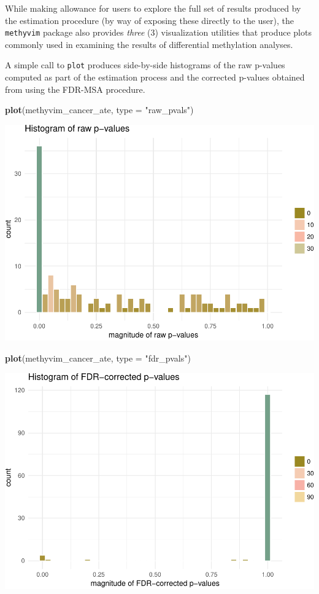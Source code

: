 \documentclass[9pt,a4paper,]{extarticle}
\newenvironment{Shaded}{\begin{snugshade}}{\end{snugshade}}
\newcommand{\KeywordTok}[1]{\textcolor[rgb]{0.13,0.29,0.53}{\textbf{#1}}}
\newcommand{\DataTypeTok}[1]{\textcolor[rgb]{0.13,0.29,0.53}{#1}}
\newcommand{\StringTok}[1]{\textcolor[rgb]{0.31,0.60,0.02}{#1}}
\newcommand{\NormalTok}[1]{#1}
\theoremstyle{definition}
\theoremstyle{definition}
\theoremstyle{definition}
\theoremstyle{remark}
\begin{document}
While making allowance for users to explore the full set of results
produced by the estimation procedure (by way of exposing these directly
to the user), the \texttt{methyvim} package also provides \emph{three}
(3) visualization utilities that produce plots commonly used in
examining the results of differential methylation analyses.

A simple call to \texttt{plot} produces side-by-side histograms of the
raw p-values computed as part of the estimation process and the
corrected p-values obtained from using the FDR-MSA procedure.

\begin{Shaded}
\begin{Highlighting}[]
\KeywordTok{plot}\NormalTok{(methyvim_cancer_ate, }\DataTypeTok{type =} \StringTok{"raw_pvals"}\NormalTok{)}
\end{Highlighting}
\end{Shaded}

\includegraphics{paper_BiocF1000_files/figure-latex/methyvim-pvals-raw-1.pdf}

\begin{Shaded}
\begin{Highlighting}[]
\KeywordTok{plot}\NormalTok{(methyvim_cancer_ate, }\DataTypeTok{type =} \StringTok{"fdr_pvals"}\NormalTok{)}
\end{Highlighting}
\end{Shaded}

\includegraphics{paper_BiocF1000_files/figure-latex/methyvim-pvals-fdr-1.pdf}
\end{document}
